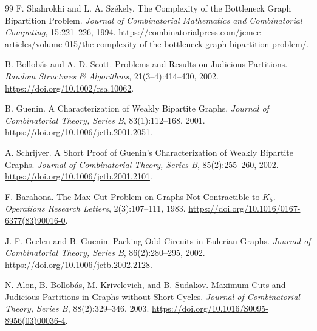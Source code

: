 \documentclass[11pt,a4paper]{ctexart}
\theoremstyle{definition}
\newcommand{\1}{\boldsymbol 1}
\begin{document}
\begin{thebibliography}{99}
F. Shahrokhi and L. A. Sz\'ekely.
\newblock The Complexity of the Bottleneck Graph Bipartition Problem.
\newblock \emph{Journal of Combinatorial Mathematics and Combinatorial Computing}, 15:221--226, 1994.
\newblock \url{https://combinatorialpress.com/jcmcc-articles/volume-015/the-complexity-of-the-bottleneck-graph-bipartition-problem/}.

B. Bollob\'as and A. D. Scott.
\newblock Problems and Results on Judicious Partitions.
\newblock \emph{Random Structures \& Algorithms}, 21(3--4):414--430, 2002.
\newblock \url{https://doi.org/10.1002/rsa.10062}.

B. Guenin.
\newblock A Characterization of Weakly Bipartite Graphs.
\newblock \emph{Journal of Combinatorial Theory, Series B}, 83(1):112--168, 2001.
\newblock \url{https://doi.org/10.1006/jctb.2001.2051}.

A. Schrijver.
\newblock A Short Proof of Guenin's Characterization of Weakly Bipartite Graphs.
\newblock \emph{Journal of Combinatorial Theory, Series B}, 85(2):255--260, 2002.
\newblock \url{https://doi.org/10.1006/jctb.2001.2101}.

F. Barahona.
\newblock The Max-Cut Problem on Graphs Not Contractible to $K_5$.
\newblock \emph{Operations Research Letters}, 2(3):107--111, 1983.
\newblock \url{https://doi.org/10.1016/0167-6377(83)90016-0}.

J. F. Geelen and B. Guenin.
\newblock Packing Odd Circuits in Eulerian Graphs.
\newblock \emph{Journal of Combinatorial Theory, Series B}, 86(2):280--295, 2002.
\newblock \url{https://doi.org/10.1006/jctb.2002.2128}.

N. Alon, B. Bollob\'as, M. Krivelevich, and B. Sudakov.
\newblock Maximum Cuts and Judicious Partitions in Graphs without Short Cycles.
\newblock \emph{Journal of Combinatorial Theory, Series B}, 88(2):329--346, 2003.
\newblock \url{https://doi.org/10.1016/S0095-8956(03)00036-4}.
\end{thebibliography}
\end{document}
